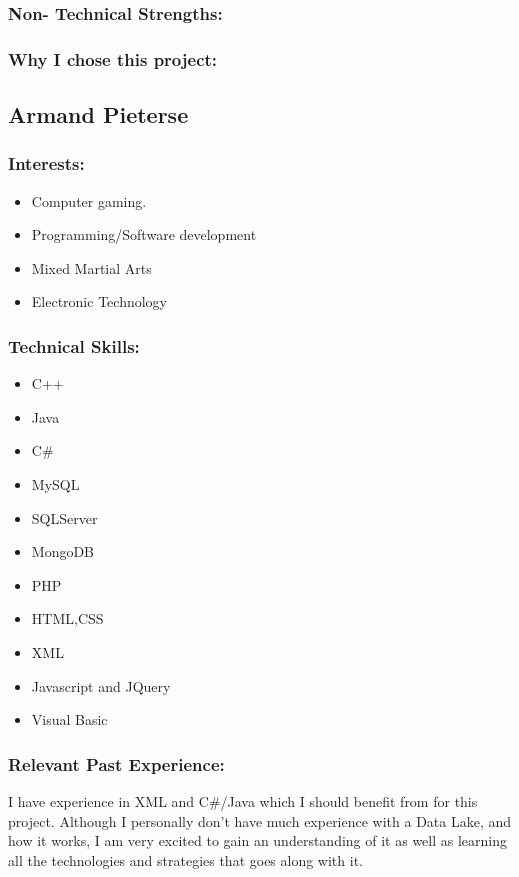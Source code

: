 \subsubsection{Non- Technical Strengths:}

\subsubsection{Why I chose this project:}

\newpage
\subsection{Armand Pieterse}
	
\subsubsection{Interests:}
	\begin{itemize}
		\item Computer gaming.
		\item Programming/Software development
		\item Mixed Martial Arts
		\item Electronic Technology
	\end{itemize}
		
\subsubsection{Technical Skills:}
	\begin{itemize}
		\item C++
		\item Java
		\item	C\#
		\item	MySQL
		\item	SQLServer
		\item	MongoDB
		\item PHP
		\item HTML,CSS
		\item XML
		\item Javascript and JQuery
		\item Visual Basic 
	\end{itemize}

\subsubsection{Relevant Past Experience:}
	\par{I have experience in XML and C\#/Java which I should benefit from for this project. Although I personally don't have much experience with a Data Lake, and how it works, I am very excited to gain an understanding of it as well as learning all the technologies and strategies that goes along with it.}

